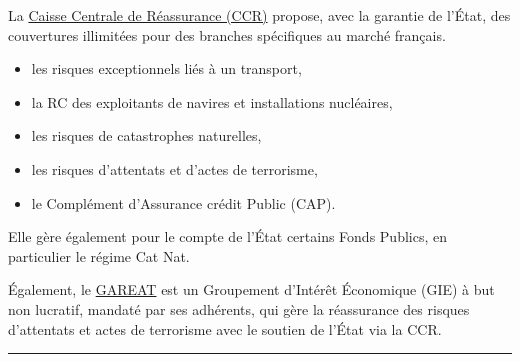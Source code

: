 \begin{f}
La \href{http://www.ccr.fr}{Caisse Centrale de Réassurance (CCR)} propose, avec la garantie de l'État, des couvertures illimitées pour des branches spécifiques au marché français.
\begin{itemize}
\item   les risques exceptionnels liés à un transport,
\item   la RC des exploitants de navires et installations nucléaires,
\item   les risques de catastrophes naturelles,
\item   les risques d'attentats et d'actes de terrorisme,
\item   le Complément d'Assurance crédit Public (CAP).
\end{itemize}
Elle gère également pour le compte de l'État certains Fonds Publics, en particulier le régime Cat Nat.

Également, le \href{http://www.gareat.com/}{GAREAT} est un Groupement d'Intérêt Économique (GIE) à but non lucratif, mandaté par ses adhérents, qui gère la réassurance des risques d'attentats et actes de terrorisme avec le soutien de l'État via la CCR.
\end{f}
\hrule

